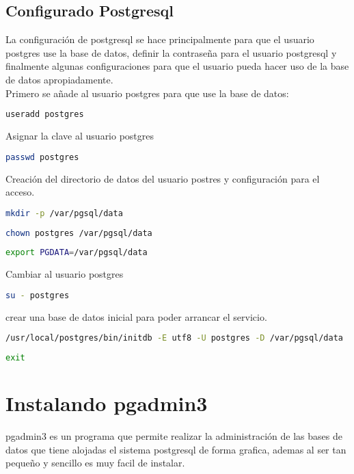 \documentclass{article}
\begin{document}
\subsection{Configurado Postgresql}
La configuración de postgresql se hace principalmente para que el usuario postgres use la base de datos, definir la contraseña para el usuario postgresql y finalmente algunas configuraciones para que el usuario pueda hacer uso de la base de datos apropiadamente.\\
Primero se añade al usuario postgres para que use la base de datos:\\
\begin{lstlisting}[language=bash, frame=single]
useradd postgres
\end{lstlisting}
Asignar la clave al usuario postgres\\
\begin{lstlisting}[language=bash, frame=single]
passwd postgres
\end{lstlisting}
Creación del directorio de datos del usuario postres y configuración para el acceso.\\
\begin{lstlisting}[language=bash, frame=single]
mkdir -p /var/pgsql/data
\end{lstlisting}
\begin{lstlisting}[language=bash, frame=single]
chown postgres /var/pgsql/data
\end{lstlisting}
\begin{lstlisting}[language=bash, frame=single]
export PGDATA=/var/pgsql/data
\end{lstlisting}
Cambiar al usuario postgres\\
\begin{lstlisting}[language=bash, frame=single]
su - postgres
\end{lstlisting}
crear una base de datos inicial para poder arrancar el servicio.\\
\begin{lstlisting}[language=bash, frame=single]
/usr/local/postgres/bin/initdb -E utf8 -U postgres -D /var/pgsql/data
\end{lstlisting}
\begin{lstlisting}[language=bash, frame=single]
exit
\end{lstlisting}
\section{Instalando pgadmin3}
pgadmin3 es un programa que permite realizar la administración de las bases de datos que tiene  alojadas el sistema postgresql de forma grafica, ademas al ser tan pequeño y sencillo es muy facil de instalar.
\end{document}
